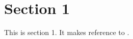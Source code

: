 \section{Section 1}\label{section-1}

This is section 1. It makes reference to
\autocite{fortunato_community_2010}.
